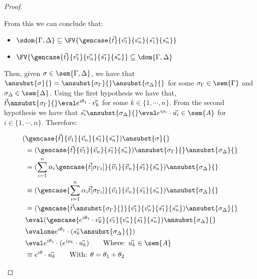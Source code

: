 \begin{proof}
\begin{description}
    From this we can conclude that:
    
    \begin{itemize}
        \item $\sdom{\Gamma,\Delta}\subseteq \FV{\gencase{\vec{t}}{\vec{v_1}}{\vec {v_n}}{\vec{s_1}}{\vec{s_n}}}$
        \item $\FV{\gencase{\vec{t}}{\vec{v_1}}{\vec {v_n}}{\vec{s_1}}{\vec{s_n}}}\subseteq \dom{\Gamma,\Delta}$
    \end{itemize}


    
    Then, given $\sigma\in\sem{\Gamma,\Delta}$, we have that $\ansubst{\sigma}{}=\ansubst{\sigma_\Gamma}{}\ansubst{\sigma_\Delta}{}$ for some $\sigma_\Gamma\in\sem{\Gamma}$ and $\sigma_\Delta\in\sem{\Delta}$. Using the first hypothesis we have that, $\vec{t}\ansubst{\sigma_\Gamma}{}\eval e^{i\theta_1}\cdot\vec{v_k}$ for some $k\in\{1,\dotsb ,n\}$. From the second hypothesis we have that $\vec{s_i}\ansubst{\sigma_\Delta}{}\eval e^{i\rho_i}\cdot\vec{u_i}\in\sem{A}$ for $i\in\{1,\dotsb , n\}$. Therefore:

    \begin{align*}
        (&\gencase{\vec{t}}{\vec v_1}{\vec v_n}{\vec{s_1}}{\vec{s_n}})\ansubst{\sigma}{}\\ 
        &= (\gencase{\vec{t}}{\vec v_1}{\vec v_n}{\vec{s_1}}{\vec{s_n}})\ansubst{\sigma_\Gamma}{}\ansubst{\sigma_\Delta}{}\\
        &= (\sum_{i=1}^{n}\alpha_i \gencase{\vec{t}[\sigma_{\Gamma i}]}{\vec v_1}{\vec v_n}{\vec{s_1}}{\vec{s_n}})\ansubst{\sigma_\Delta}{} \\
        &\equiv (\gencase{\sum_{i=1}^{n} \alpha_i \vec{t}[\sigma_{\Gamma i}]}{\vec v_1}{\vec v_n}{\vec{s_1}}{\vec{s_n}})\ansubst{\sigma_\Delta}{}\\
        &=(\gencase{\vec{t}\ansubst{\sigma_\Gamma}{}}{\vec{v_1}}{\vec{v_n}}{\vec{s_1}}{\vec{s_n}})\ansubst{\sigma_\Delta}{}\\
        &\eval(\gencase{e^{i\theta_1}\cdot\vec{v_k}}{\vec{v_1}}{\vec{v_n}}{\vec{s_1}}{\vec{s_n}})\ansubst{\sigma_\Delta}{}\\
        &\evalone e^{i\theta_1}\cdot(\vec{s_k}\ansubst{\sigma_\Delta}{})\\
        &\eval e^{i\theta_1}\cdot(e^{i\rho_k}\cdot\vec{u_k})\qquad\text{Where: }\vec{u_k}\in\sem{A}\\
        &\equiv e^{i\theta}\cdot\vec{u_k}\qquad\text{With: }\theta=\theta_1 +\theta_2
    \end{align*}
    

\end{description}
\end{proof}
